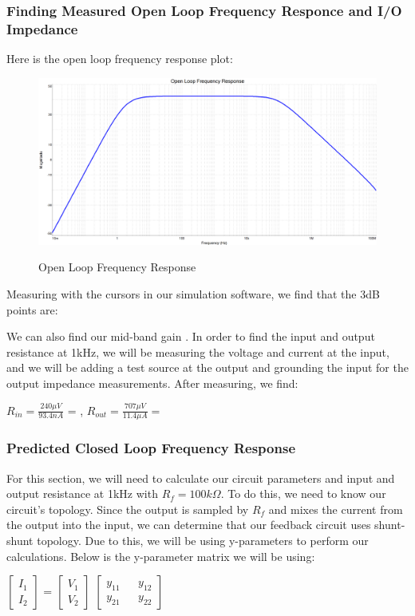 \documentclass[12pt]{article}
\begin{document}
\subsubsection{Finding Measured Open Loop Frequency Responce and I/O Impedance}
Here is the open loop frequency response plot:
\begin{figure}[h!]
    \centering
    \includegraphics[height=0.35\textwidth]{Images/partCbode.png}\\
    \caption{Open Loop Frequency Response}
    \label{fig:olfreqresponse}
\end{figure}
\FloatBarrier
Measuring with the cursors in our simulation software, we find that the 
3dB points are: 
\begin{center}
\end{center}
We can also find our mid-band gain .
In order to find the input and output resistance at 1kHz, we will be measuring the voltage 
and current at the input, and we will be adding a test source at the output and grounding the
input for the output impedance measurements. After measuring, we find: 
\begin{center}
$R_{in} = \frac{240\mu V}{93.4nA}$ = , 
$R_{out} = \frac{707\mu V}{11.4 \mu A} = $ \boxed{62.017\Omega}
\end{center}

\subsubsection{Predicted Closed Loop Frequency Response}
For this section, we will need to calculate our circuit parameters and input and 
output resistance at 1kHz with $R_f=100k\Omega$. To do this, we need to know our circuit's 
topology. Since the output is sampled by $R_f$ and mixes the current from the output into the
input, we can determine that our feedback circuit uses shunt-shunt topology. Due to this,
we will be using y-parameters to perform our calculations. Below is the y-parameter matrix
we will be using:
\begin{center}
$\begin{bmatrix}
        I_1 \\
        I_2
\end{bmatrix}$ =
$\begin{bmatrix}
    V_{1} \\
    V_{2}  
\end{bmatrix}$ 
$\begin{bmatrix}
    y_{11} && y_{12} \\
    y_{21} && y_{22} 
\end{bmatrix}$
\end{center}
\end{document}
